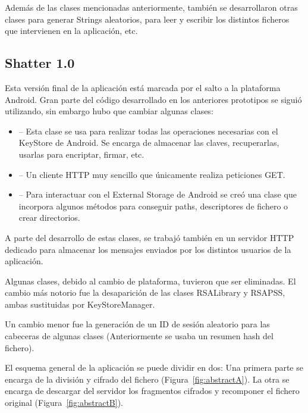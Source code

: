 Además de las clases mencionadas anteriormente, también se desarrollaron otras
clases para generar Strings aleatorios, para leer y escribir los distintos
ficheros que intervienen en la aplicación, etc.

\subsection{Shatter 1.0}

Esta versión final de la aplicación está marcada por el salto a la plataforma
Android. Gran parte del código desarrollado en los anteriores prototipos se
siguió utilizando, sin embargo hubo que cambiar algunas clases:

\begin{itemize}
  \item {} -- Esta clase se usa para realizar todas las
  operaciones necesarias con el KeyStore de Android. Se encarga de almacenar las
  claves, recuperarlas, usarlas para encriptar, firmar, etc.

  \item {} -- Un cliente HTTP muy sencillo que únicamente
  realiza peticiones GET.

  \item {} -- Para interactuar con el External Storage de
  Android se creó una clase que incorpora algunos métodos para conseguir paths,
  descriptores de fichero o crear directorios.
\end{itemize}

A parte del desarrollo de estas clases, se trabajó también en un servidor HTTP
dedicado para almacenar los mensajes enviados por los distintos usuarios de la
aplicación.

Algunas clases, debido al cambio de plataforma, tuvieron que ser eliminadas.
El cambio más notorio fue la desaparición de las clases RSALibrary y RSAPSS,
ambas sustituidas por KeyStoreManager.

Un cambio menor fue la generación de un ID de sesión aleatorio para las
cabeceras de algunas clases (Anteriormente se usaba un resumen hash del
fichero).

El esquema general de la aplicación se puede dividir en dos: Una primera parte
se encarga de la división y cifrado del fichero (Figura~\ref{fig:abstractA}). La
otra se encarga de descargar del servidor los fragmentos cifrados y recomponer
el fichero original (Figura~\ref{fig:abstractB}).

